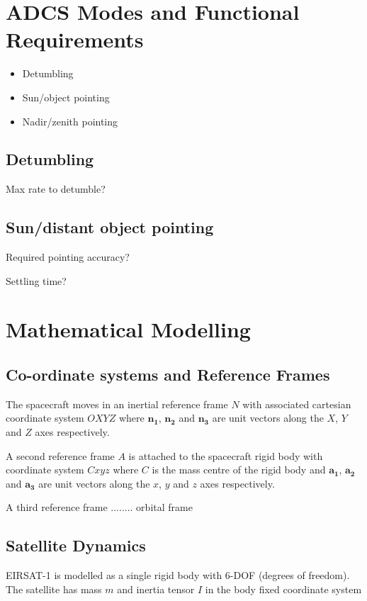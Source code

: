 \section{ADCS Modes and Functional Requirements}

\begin{itemize}
\item Detumbling
\item Sun/object pointing
\item Nadir/zenith pointing
\end{itemize}

\subsection{Detumbling}
Max rate to detumble?

\subsection{Sun/distant object pointing}
Required pointing accuracy?

Settling time?

\section{Mathematical Modelling}
\subsection{Co-ordinate systems and Reference Frames}

The spacecraft moves in an inertial reference frame $N$ with associated cartesian coordinate system $OXYZ$ where $\mathbf{n_1}$, $\mathbf{n_2}$ and $\mathbf{n_3}$ are unit vectors along the $X$, $Y$ and $Z$ axes respectively.

A second reference frame $A$ is attached to the spacecraft rigid body with coordinate system $Cxyz$ where $C$ is the mass centre of the rigid body and $\mathbf{a_1}$, $\mathbf{a_2}$ and $\mathbf{a_3}$ are unit vectors along the $x$, $y$ and $z$ axes respectively.

A third reference frame ........  orbital frame

\subsection{Satellite Dynamics}

EIRSAT-1 is modelled as a single rigid body with 6-DOF (degrees of freedom).
The satellite has mass $m$ and inertia tensor $I$ in the body fixed coordinate system

